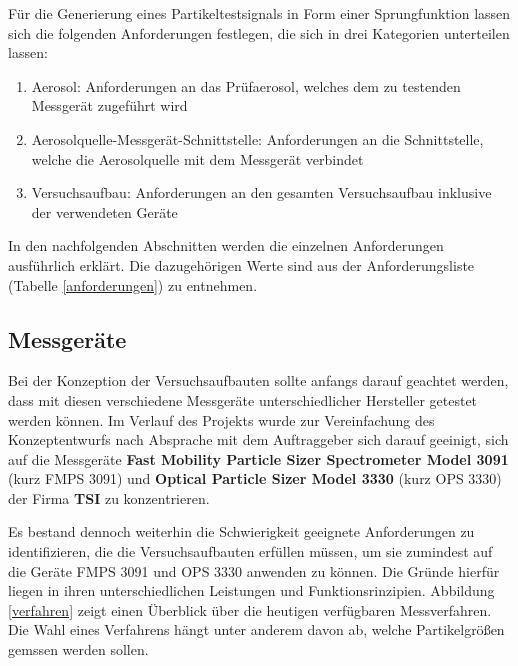 F\"{u}r die Generierung eines Partikeltestsignals in Form einer Sprungfunktion lassen sich die folgenden Anforderungen festlegen, die sich in drei Kategorien unterteilen lassen:
\begin{enumerate}
	\item Aerosol: Anforderungen an das Pr\"{u}faerosol, welches dem zu testenden Messger\"{a}t zugef\"{u}hrt wird
	\item Aerosolquelle-Messger\"{a}t-Schnittstelle: Anforderungen an die Schnittstelle, welche die Aerosolquelle mit dem Messger\"{a}t verbindet
	\item Versuchsaufbau: Anforderungen an den gesamten Versuchsaufbau inklusive der verwendeten Ger\"{a}te
\end{enumerate}

In den nachfolgenden Abschnitten werden die einzelnen Anforderungen ausf\"{u}hrlich erkl\"{a}rt. Die dazugeh\"{o}rigen Werte sind aus der Anforderungsliste (Tabelle \ref{anforderungen}) zu entnehmen.

\subsection{Messger\"{a}te}
Bei der Konzeption der Versuchsaufbauten sollte anfangs darauf geachtet werden, dass mit diesen verschiedene Messger\"{a}te unterschiedlicher Hersteller getestet werden k\"{o}nnen. Im Verlauf des Projekts wurde zur Vereinfachung des Konzeptentwurfs nach Absprache mit dem Auftraggeber sich darauf geeinigt, sich auf die Messger\"{a}te \textbf{Fast Mobility Particle Sizer Spectrometer Model 3091} (kurz FMPS 3091) und \textbf{Optical Particle Sizer Model 3330} (kurz OPS 3330) der Firma \textbf{TSI} zu konzentrieren. 

Es bestand dennoch weiterhin die Schwierigkeit geeignete Anforderungen zu identifizieren, die die Versuchsaufbauten erf\"{u}llen m\"{u}ssen, um sie zumindest auf die Ger\"{a}te FMPS 3091 und OPS 3330 anwenden zu k\"{o}nnen. Die Gr\"{u}nde hierf\"{u}r liegen in ihren unterschiedlichen Leistungen und Funktionsrinzipien. Abbildung \ref{verfahren} zeigt einen \"{U}berblick \"{u}ber die heutigen verf\"{u}gbaren Messverfahren. Die Wahl eines Verfahrens h\"{a}ngt unter anderem davon ab, welche Partikelgr\"{o}{\ss}en gemssen werden sollen. 

